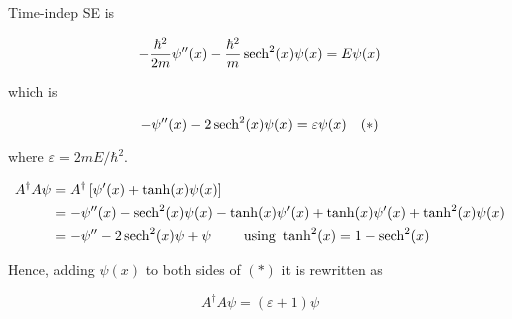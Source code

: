 \documentclass[a4paper]{article}
\begin{document}
Time-indep SE is

\[ - \frac{\hbar^{2}}{2m}\psi''(x)  - \frac{\hbar^{2}}{m} \operatorname{sech}^{2}(x) \psi(x) = E \psi(x) \]

which is

\[ -\psi''(x) - 2 \operatorname{sech}^{2}(x) \psi(x) =  \varepsilon \psi(x) \quad (*) \]

where $ \varepsilon = 2mE / \hbar^{2}  $.

\begin{align*}
A^{\dagger} A \psi & = A^{\dagger} \left[ \psi'(x) + \tanh(x) \psi(x)  \right]   \\
& = -\psi''(x) - \operatorname{sech}^{2}(x) \psi(x) - \tanh(x) \psi'(x) + \tanh(x) \psi'(x) + \tanh^{2}(x) \psi(x) \\
& = - \psi'' -2 \operatorname{sech}^{2}(x) \psi + \psi \qquad \text{ using } \tanh^{2}(x) = 1 - \operatorname{sech}^{2}(x)
\end{align*}

Hence, adding $ \psi(x) $ to both sides of $ (*) $ it is rewritten as

\[ A^{\dagger} A \psi = (\varepsilon + 1)\psi \]
\end{document}
